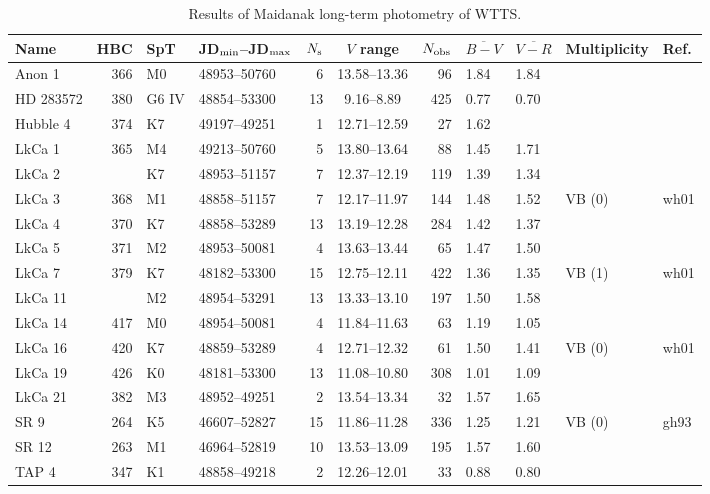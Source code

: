 \begin{table}%
\caption{Results of Maidanak long-term photometry of WTTS.}\label{tab1}
\small%
 {
\begin{tabular}{lrllrcrllll}
\hline \hline
Name      & HBC & SpT   &JD$_{\rm min}$--JD$_{\rm max}$ & $N_{\rm s}$ & $V$ range & $N_{\rm obs}$
& $\overline{B-V}$ & $\overline{V-R}$ & Multiplicity & Ref.\\
\hline
Anon 1    & 366 & M0    & 48953--50760 &  6 & 13.58--13.36 &  96 & 1.84 & 1.84 & & \\
HD 283572 & 380 & G6 IV & 48854--53300 & 13 &  9.16--8.89  & 425 & 0.77 & 0.70 & & \\
Hubble 4  & 374 & K7    & 49197--49251 &  1 & 12.71--12.59 &  27 & 1.62 & & &   \\
LkCa 1    & 365 & M4    & 49213--50760 &  5 & 13.80--13.64 &  88 & 1.45 & 1.71 & & \\
LkCa 2    &     & K7    & 48953--51157 &  7 & 12.37--12.19 & 119 & 1.39 & 1.34 & & \\
LkCa 3    & 368 & M1    & 48858--51157 &  7 & 12.17--11.97 & 144 & 1.48 & 1.52 & VB
(0\farcs48) & wh01 \\
LkCa 4    & 370 & K7    & 48858--53289 & 13 & 13.19--12.28 & 284 & 1.42 & 1.37 & & \\
LkCa 5    & 371 & M2    & 48953--50081 &  4 & 13.63--13.44 &  65 & 1.47 & 1.50 & & \\
LkCa 7    & 379 & K7    & 48182--53300 & 15 & 12.75--12.11 & 422 & 1.36 & 1.35 & VB
(1\farcs02) & wh01 \\
LkCa 11   &     & M2    & 48954--53291 & 13 & 13.33--13.10 & 197 & 1.50 & 1.58 & & \\
LkCa 14   & 417 & M0    & 48954--50081 &  4 & 11.84--11.63 &  63 & 1.19 & 1.05 & & \\
LkCa 16   & 420 & K7    & 48859--53289 &  4 & 12.71--12.32 &  61 & 1.50 & 1.41 & VB
(0\farcs29) & wh01 \\
LkCa 19   & 426 & K0    & 48181--53300 & 13 & 11.08--10.80 & 308 & 1.01 & 1.09 & & \\
LkCa 21   & 382 & M3    & 48952--49251 &  2 & 13.54--13.34 &  32 & 1.57 & 1.65 & & \\
SR 9      & 264 & K5    & 46607--52827 & 15 & 11.86--11.28 & 336 & 1.25 & 1.21 & VB
(0\farcs59) & gh93 \\
SR 12     & 263 & M1    & 46964--52819 & 10 & 13.53--13.09 & 195 & 1.57 & 1.60 & & \\
TAP 4     & 347 & K1    & 48858--49218 &  2 & 12.26--12.01 &  33 & 0.88 & 0.80 & & \\

\end{tabular}}
\end{table}
